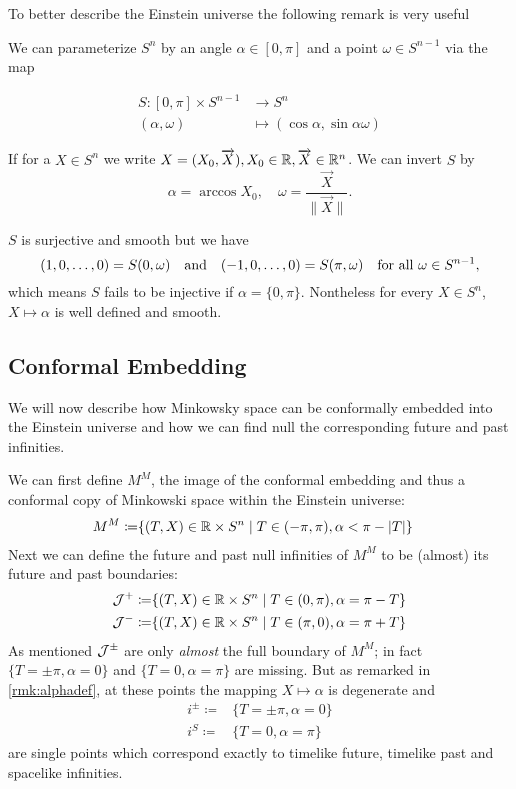 To better describe the Einstein universe the following remark is very useful
\begin{remark}\label{rmk:alphadef}
We can parameterize $S^n$ by an angle $\alpha\in [0,\pi]$ and a point $\omega\in S^{n-1}$ via the map 

\begin{align*}
    S:[0,\pi]\times S^{n-1}&\to S^n \\
    (\alpha,\omega) &\mapsto (\cos \alpha, \sin \alpha \omega)
\end{align*}

If for a $X\in S^n$ we write $X=(X_0,\overrightarrow{X}), X_0\in \mathbb{R}, \overrightarrow{X}\in \mathbb{R}^n$. We can invert $S$ by 
\[
    \alpha = \arccos X_0, \quad \omega=\frac{\overrightarrow{X}}{\lVert\overrightarrow{X}\rVert}.
\]

$S$ is surjective and smooth but we have 
\[(1,0,\dots, 0) = S(0,\omega) \quad \text{and} \quad (-1,0,\dots,0)=S(\pi,\omega) \quad \text{for all }\omega\in {S^{n-1}},\]
which means $S$ fails to be injective if $\alpha = \{0,\pi\}$. Nontheless for every $X\in S^n$, $X\mapsto \alpha$ is well defined and smooth.
\end{remark}

\subsection{Conformal Embedding}
We will now describe how Minkowsky space can be conformally embedded into the Einstein universe and how we can find null the corresponding future and past infinities.
\begin{definition}
    We can first define $M^M$, the image of the conformal embedding and thus a conformal copy of Minkowski space within the Einstein universe:
    \begin{align*}
        M^M\coloneqq &\{(T,X)\in \mathbb{R}\times S^n \mid T\in(-\pi,\pi), \alpha<\pi-\lvert T\rvert\}
    \end{align*}
    Next we can define the future and past null infinities of $M^M$ to be (almost) its future and past boundaries:
    \begin{align*}
        {\mathcal{J}}^+\coloneqq &\{(T,X)\in \mathbb{R}\times S^n \mid T\in(0,\pi), \alpha = \pi - T\}\\
        {\mathcal{J}}^-\coloneqq &\{(T,X)\in \mathbb{R}\times S^n \mid T\in(\pi,0), \alpha = \pi + T\}
    \end{align*}
    As mentioned ${\mathcal{J}}^\pm$ are only \emph{almost} the full boundary of $M^M$; in fact $\{T=\pm\pi,\alpha=0\}$ and $\{T=0,\alpha=\pi\}$ are missing. But as remarked in \ref{rmk:alphadef}, at these points the mapping $X\mapsto \alpha$ is degenerate and 
    \begin{align*}
        i^\pm \coloneqq & \{T=\pm\pi,\alpha=0\} \\
        i^S \coloneqq  & \{T=0,\alpha=\pi\}
    \end{align*}
    are single points which correspond exactly to timelike future, timelike past and spacelike infinities.
\end{definition}

